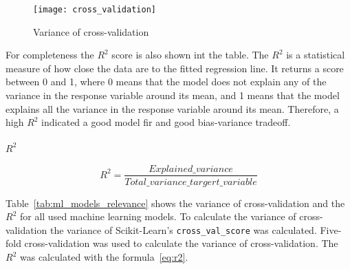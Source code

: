 \begin{figure}[h]
    \begin{tcolorbox}[arc=0pt,boxrule=0.5pt]
        \centering
        \texttt{[image: cross\_validation]}
        \caption{Variance of cross-validation}
        \label{fig:variance-of-cv}
    \end{tcolorbox}
\end{figure}

For completeness the \(R^2\) score is also shown int the table.
The \(R^2\) is a statistical measure of how close the data are to the fitted
regression line.
It returns a score between 0 and 1, where 0 means that the model does not
explain any of the
variance in the response variable around its mean, and 1 means that the model
explains all the
variance in the response variable around its mean.
Therefore, a high \(R^2\) indicated a good model fir and good bias-variance
tradeoff.
\cite[p. 43]{muller_introductionmachinelearning_2016}

\paragraph*{\(R^2\)}

\begin{equation}
    \label{eq:r2}
    R^2 = \frac{Explained\_variance}{Total\_variance\_targert\_variable}
\end{equation}

Table~\ref*{tab:ml_models_relevance} shows the variance of cross-validation
and the \(R^2\) for all
used machine learning models.
To calculate the variance of cross-validation the variance of Scikit-Learn's
\texttt{cross\_val\_score} was calculated.
Five-fold cross-validation was used to calculate the variance of
cross-validation. The \(R^2\) was
calculated with the formula~\ref{eq:r2}.

